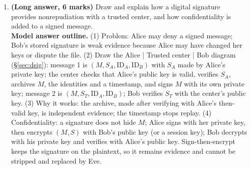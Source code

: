 \begin{enumerate}[leftmargin=1.6em,itemsep=4pt]
  \item \textbf{(Long answer, 6 marks)} Draw and explain how a digital signature provides nonrepudiation with a trusted center, and how confidentiality is added to a signed message.\\
  \textbf{Model answer outline.} (1) Problem: Alice may deny a signed message; Bob's stored signature is weak evidence because Alice may have changed her keys or dispute the file. (2) Draw the Alice | Trusted center | Bob diagram (\S\ref{sec:dsig}): message 1 is $(M, S_A, \mathrm{ID}_A, \mathrm{ID}_B)$ with $S_A$ made by Alice's private key; the center checks that Alice's public key is valid, verifies $S_A$, archives $M$, the identities and a timestamp, and signs $M$ with its own private key; message 2 is $(M, S_T, \mathrm{ID}_A, \mathrm{ID}_B)$; Bob verifies $S_T$ with the center's public key. (3) Why it works: the archive, made after verifying with Alice's then-valid key, is independent evidence; the timestamp stops replay. (4) Confidentiality: a signature does not hide $M$; Alice signs with her private key, then encrypts $(M, S)$ with Bob's public key (or a session key); Bob decrypts with his private key and verifies with Alice's public key. Sign-then-encrypt keeps the signature on the plaintext, so it remains evidence and cannot be stripped and replaced by Eve.
\end{enumerate}
